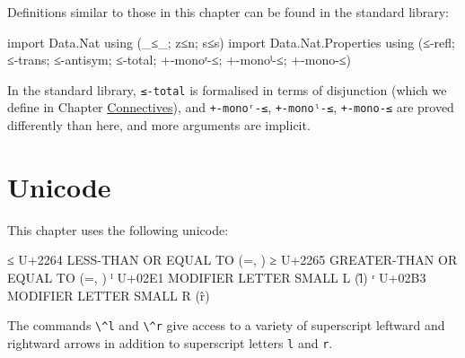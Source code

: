 Definitions similar to those in this chapter can be found in the
standard library:

\begin{fence}
\begin{code}
import Data.Nat using (_≤_; z≤n; s≤s)
import Data.Nat.Properties using (≤-refl; ≤-trans; ≤-antisym; ≤-total;
                                  +-monoʳ-≤; +-monoˡ-≤; +-mono-≤)
\end{code}
\end{fence}

In the standard library, \texttt{≤-total} is formalised in terms of
disjunction (which we define in Chapter
\protect\hyperlink{Connectives}{Connectives}), and \texttt{+-monoʳ-≤},
\texttt{+-monoˡ-≤}, \texttt{+-mono-≤} are proved differently than here,
and more arguments are implicit.

\hypertarget{unicode}{%
\section{Unicode}\label{unicode}}

This chapter uses the following unicode:

\begin{myDisplay}
≤  U+2264  LESS-THAN OR EQUAL TO (\<=, \le)
≥  U+2265  GREATER-THAN OR EQUAL TO (\>=, \ge)
ˡ  U+02E1  MODIFIER LETTER SMALL L (\^l)
ʳ  U+02B3  MODIFIER LETTER SMALL R (\^r)
\end{myDisplay}

The commands \texttt{\textbackslash{}\^{}l} and
\texttt{\textbackslash{}\^{}r} give access to a variety of superscript
leftward and rightward arrows in addition to superscript letters
\texttt{l} and \texttt{r}.

